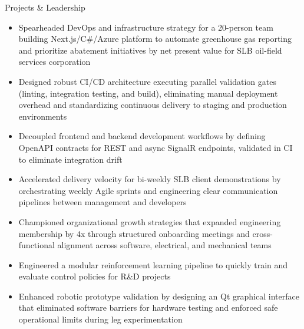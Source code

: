 \documentclass{resume}
\begin{document}
\begin{experienceSection}{Projects \& Leadership}
	\projectItem[
		title={SLB Emissions Reduction Platform (Capstone Senior Design): DevOps Lead},
		duration={August 2026 – December 2026}
	]
	\begin{itemize}
		\vspace{-0.5em}
		\itemsep -6pt {}
		\item Spearheaded DevOps and infrastructure strategy for a 20-person team building Next.js/C\#/Azure platform to automate greenhouse gas reporting and prioritize abatement initiatives by net present value for SLB oil-field services corporation
		\item Designed robust CI/CD architecture executing parallel validation gates (linting, integration testing, and build), eliminating manual deployment overhead and standardizing continuous delivery to staging and production environments
		\item Decoupled frontend and backend development workflows by defining OpenAPI contracts for REST and async SignalR endpoints, validated in CI to eliminate integration drift
		\item Accelerated delivery velocity for bi-weekly SLB client demonstrations by orchestrating weekly Agile sprints and engineering clear communication pipelines between management and developers
	\end{itemize}
	\projectItem[
		title={Rice Robotics Club: R\&D Software Lead},
		duration={February 2024 – Present}
	]
	\begin{itemize}
		\vspace{-0.5em}
		\itemsep -6pt {}
		\item Championed organizational growth strategies that expanded engineering membership by 4x through structured onboarding meetings and cross-functional alignment across software, electrical, and mechanical teams
		\item Engineered a modular reinforcement learning pipeline to quickly train and evaluate control policies for R\&D projects
		\item Enhanced robotic prototype validation by designing an Qt graphical interface that eliminated software barriers for hardware testing and enforced safe operational limits during leg experimentation
	\end{itemize}
\end{experienceSection}
\end{document}
